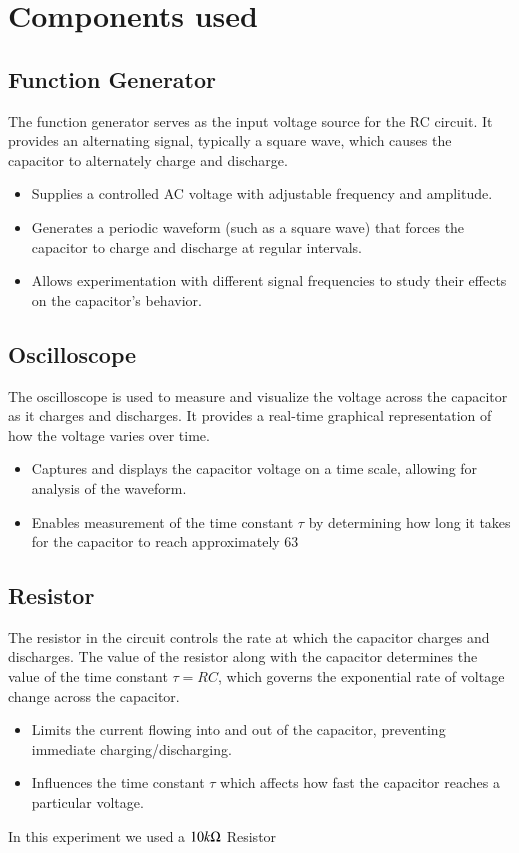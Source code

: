 \documentclass[journal]{IEEEtran}
\begin{document}
\section{Components used }
\subsection{Function Generator}
The function generator serves as the input voltage source for the RC circuit. It provides an alternating signal, typically a square wave, which causes the capacitor to alternately charge and discharge.
\begin{itemize}
    \item Supplies a controlled AC voltage with adjustable frequency and amplitude.
    \item Generates a periodic waveform (such as a square wave) that forces the capacitor to charge and discharge at regular intervals.
    \item Allows experimentation with different signal frequencies to study their effects on the capacitor's behavior.
\end{itemize}
\subsection{Oscilloscope}
The oscilloscope is used to measure and visualize the voltage across the capacitor as it charges and discharges. It provides a real-time graphical representation of how the voltage varies over time.
\begin{itemize}
    \item Captures and displays the capacitor voltage on a time scale, allowing for analysis of the waveform.
    \item Enables measurement of the time constant $\tau$ by determining how long it takes for the capacitor to reach approximately 63%
\end{itemize}
\subsection{Resistor}
The resistor in the circuit controls the rate at which the capacitor charges and discharges. The value of the resistor along with the capacitor determines the value of the time constant $\tau = RC$, which governs the exponential rate of voltage change across the capacitor.
\begin{itemize}
    \item Limits the current flowing into and out of the capacitor, preventing immediate charging/discharging.
    \item Influences the time constant $\tau$ which affects how fast the capacitor reaches a particular voltage.
\end{itemize}
In this experiment we used a $10k\ohm$ Resistor 
\end{document}
